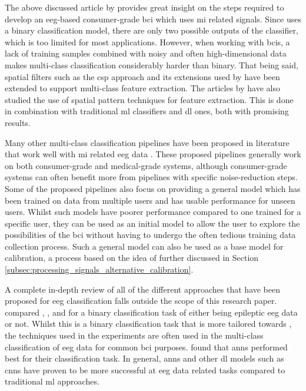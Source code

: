 
The above discussed article by \citet{cheap_bci_feasibility} provides great insight on the steps required to develop an \gls{eeg}-based consumer-grade \gls{bci} which uses \gls{mi} related signals.
Since \citet{cheap_bci_feasibility} uses a binary classification model, there are only two possible outputs of the classifier, which is too limited for most applications.
However, when working with \glspl{bci}, a lack of training samples combined with noisy and often high-dimensional data makes multi-class classification considerably harder than binary.
That being said, spatial filters such as the \gls{csp} approach and its extensions used by \citet{cheap_bci_feasibility} have been extended to support multi-class feature extraction.
The articles by \citet{eeg_mi_model_lda_csp, eeg_mi_model_deep_cnn_spatial_filters} have also studied the use of spatial pattern techniques for feature extraction.
This is done in combination with traditional \gls{ml} classifiers and \gls{dl} ones, both with promising results.

Many other multi-class classification pipelines have been proposed in literature that work well with \gls{mi} related \gls{eeg} data \citep{fbcnet, eeg_mi_model_mussi, eeg_mi_model_lda_csp, eeg_mi_model_deep_cnn_spatial_filters, eeg_mi_model_image_based, eeg_model_fbcsp, eeg_model_hbm, eeg_model_esi, eeg_model_eegnet}.
These proposed pipelines generally work on both consumer-grade and medical-grade systems, although consumer-grade systems can often benefit more from pipelines with specific noise-reduction steps.
Some of the proposed pipelines also focus on providing a general model which has been trained on data from multiple users and has usable performance for unseen users.
Whilst such models have poorer performance compared to one trained for a specific user, they can be used as an initial model to allow the user to explore the possibilities of the \gls{bci} without having to undergo the often tedious training data collection process.
Such a general model can also be used as a base model for calibration, a process based on the idea of  further discussed in Section \ref{subsec:processing_signals_alternative_calibration}.

A complete in-depth review of all of the different approaches that have been proposed for \gls{eeg} classification falls outside the scope of this research paper.
 compared , ,  and  for a binary classification task of either being epileptic \gls{eeg} data or not.
Whilst this is a binary classification task that is more tailored towards , the techniques used in the experiments are often used in the multi-class classification of \gls{eeg} data for common \gls{bci} purposes.
 found that \glspl{ann} performed best for their classification task.
In general, \glspl{ann} and other \gls{dl} models such as \glspl{cnn} have proven to be more successful at \gls{eeg} data related tasks compared to traditional \gls{ml} approaches.

